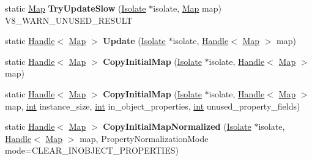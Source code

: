 \begin{DoxyCompactItemize}
\item 
\mbox{\label{classv8_1_1internal_1_1Map_a4df0dd6014c805dae38ff8dfef39a0bf}} 
static \mbox{\hyperlink{classv8_1_1internal_1_1Map}{Map}} {\bfseries Try\+Update\+Slow} (\mbox{\hyperlink{classv8_1_1internal_1_1Isolate}{Isolate}} $\ast$isolate, \mbox{\hyperlink{classv8_1_1internal_1_1Map}{Map}} map) V8\+\_\+\+W\+A\+R\+N\+\_\+\+U\+N\+U\+S\+E\+D\+\_\+\+R\+E\+S\+U\+LT
\item 
\mbox{\label{classv8_1_1internal_1_1Map_acc15bd8373a5ad8e971258216a6df4a2}} 
static \mbox{\hyperlink{classv8_1_1internal_1_1Handle}{Handle}}$<$ \mbox{\hyperlink{classv8_1_1internal_1_1Map}{Map}} $>$ {\bfseries Update} (\mbox{\hyperlink{classv8_1_1internal_1_1Isolate}{Isolate}} $\ast$isolate, \mbox{\hyperlink{classv8_1_1internal_1_1Handle}{Handle}}$<$ \mbox{\hyperlink{classv8_1_1internal_1_1Map}{Map}} $>$ map)
\item 
\mbox{\label{classv8_1_1internal_1_1Map_a3a692945e723613a721e6fe9a9f4b478}} 
static \mbox{\hyperlink{classv8_1_1internal_1_1Handle}{Handle}}$<$ \mbox{\hyperlink{classv8_1_1internal_1_1Map}{Map}} $>$ {\bfseries Copy\+Initial\+Map} (\mbox{\hyperlink{classv8_1_1internal_1_1Isolate}{Isolate}} $\ast$isolate, \mbox{\hyperlink{classv8_1_1internal_1_1Handle}{Handle}}$<$ \mbox{\hyperlink{classv8_1_1internal_1_1Map}{Map}} $>$ map)
\item 
\mbox{\label{classv8_1_1internal_1_1Map_aad038be1ea2dd6d58f03ef5f1f3acbef}} 
static \mbox{\hyperlink{classv8_1_1internal_1_1Handle}{Handle}}$<$ \mbox{\hyperlink{classv8_1_1internal_1_1Map}{Map}} $>$ {\bfseries Copy\+Initial\+Map} (\mbox{\hyperlink{classv8_1_1internal_1_1Isolate}{Isolate}} $\ast$isolate, \mbox{\hyperlink{classv8_1_1internal_1_1Handle}{Handle}}$<$ \mbox{\hyperlink{classv8_1_1internal_1_1Map}{Map}} $>$ map, \mbox{\hyperlink{classint}{int}} instance\+\_\+size, \mbox{\hyperlink{classint}{int}} in\+\_\+object\+\_\+properties, \mbox{\hyperlink{classint}{int}} unused\+\_\+property\+\_\+fields)
\item 
\mbox{\label{classv8_1_1internal_1_1Map_a4804ee7f1becb35dcaa7164cb6d7afb0}} 
static \mbox{\hyperlink{classv8_1_1internal_1_1Handle}{Handle}}$<$ \mbox{\hyperlink{classv8_1_1internal_1_1Map}{Map}} $>$ {\bfseries Copy\+Initial\+Map\+Normalized} (\mbox{\hyperlink{classv8_1_1internal_1_1Isolate}{Isolate}} $\ast$isolate, \mbox{\hyperlink{classv8_1_1internal_1_1Handle}{Handle}}$<$ \mbox{\hyperlink{classv8_1_1internal_1_1Map}{Map}} $>$ map, Property\+Normalization\+Mode mode=C\+L\+E\+A\+R\+\_\+\+I\+N\+O\+B\+J\+E\+C\+T\+\_\+\+P\+R\+O\+P\+E\+R\+T\+I\+ES)

\end{DoxyCompactItemize}
